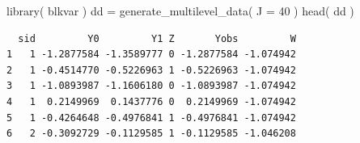 \documentclass[
  letterpaper,
  DIV=11,
  numbers=noendperiod]{scrreprt}
\newenvironment{Shaded}{\begin{snugshade}}{\end{snugshade}}
\newcommand{\AttributeTok}[1]{\textcolor[rgb]{0.49,0.56,0.16}{#1}}
\newcommand{\DecValTok}[1]{\textcolor[rgb]{0.25,0.63,0.44}{#1}}
\newcommand{\FunctionTok}[1]{\textcolor[rgb]{0.02,0.16,0.49}{#1}}
\newcommand{\NormalTok}[1]{\textcolor[rgb]{0.00,0.44,0.13}{#1}}
\newcommand{\OtherTok}[1]{\textcolor[rgb]{0.00,0.44,0.13}{#1}}
\newcommand{\SpecialCharTok}[1]{\textcolor[rgb]{0.25,0.44,0.63}{#1}}
\begin{document}
\begin{Shaded}
\begin{Highlighting}[]
\FunctionTok{library}\NormalTok{( blkvar )}
\NormalTok{dd }\OtherTok{=} \FunctionTok{generate\_multilevel\_data}\NormalTok{( }\AttributeTok{J =} \DecValTok{40}\NormalTok{ )}
\FunctionTok{head}\NormalTok{( dd )}
\end{Highlighting}
\end{Shaded}

\begin{verbatim}
  sid         Y0         Y1 Z       Yobs         W
1   1 -1.2877584 -1.3589777 0 -1.2877584 -1.074942
2   1 -0.4514770 -0.5226963 1 -0.5226963 -1.074942
3   1 -1.0893987 -1.1606180 0 -1.0893987 -1.074942
4   1  0.2149969  0.1437776 0  0.2149969 -1.074942
5   1 -0.4264648 -0.4976841 1 -0.4976841 -1.074942
6   2 -0.3092729 -0.1129585 1 -0.1129585 -1.046208
\end{verbatim}

\begin{Shaded}
\end{Shaded}
\end{document}
